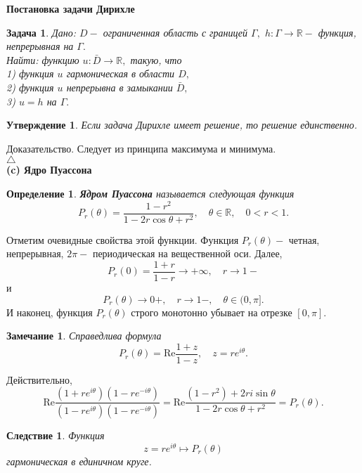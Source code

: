 \documentclass[12 pt, a4 paper]{article}
\theoremstyle{plain}   \newtheorem{Pro}{Задача}
\newtheorem{Sta}{Утверждение}
\newtheorem{Def}{Определение}
\newtheorem{Rem}{Замечание}
\newtheorem{Cor}{Следствие}
\begin{document}
{\bfseries Постановка задачи Дирихле}
\begin{Pro}
{\Large Дано:}
$ D - $
ограниченная область с границей
$ \Gamma , $
$ h: \Gamma \longrightarrow \mathbb{R} - $
функция, непрерывная на
$ \Gamma . $
\\
{ \Large Найти:}
функцию
$ u:\bar D \longrightarrow \mathbb{R} , $
такую, что
\\
1) функция
$ u $
гармоническая в области
$ D , $
\\
2) функция
$ u $
непрерывна в замыкании
$ \bar D , $
\\
3) $ u=h $ на $ \Gamma . $
\end{Pro}
\begin{Sta}
Если задача Дирихле имеет решение, то решение единственно.
\end{Sta}
{\Large Доказательство.}
Следует из принципа максимума и минимума.
\\
$ \triangle $
\\
{\bfseries (c) Ядро Пуассона}
\begin{Def}
{\bfseries Ядром Пуассона}
называется следующая функция
$$
  P_r (\theta )=
  \frac{1-r^2}{1-2r\cos \theta +r^2},
  \quad \theta \in \mathbb{R},
  \quad 0<r<1.
$$
\end{Def}
Отметим очевидные свойства этой функции.
Функция
$ P_r (\theta ) - $
четная, непрерывная,
$ 2\pi-$
периодическая на вещественной оси.
Далее,
$$
  P_r (0)=\frac{1+r}{1-r} \rightarrow +\infty ,
  \quad r \rightarrow 1-
$$
и
$$
  P_r (\theta ) \rightarrow 0+ ,
  \quad r \rightarrow 1-  , \quad
  \theta \in (0, \pi ] .
$$
И наконец, функция
$ P_r (\theta ) $
строго монотонно убывает на отрезке
$ [0,\pi ]. $
\begin{Rem}
Справедлива формула
$$
  P_r (\theta )= \mathrm{Re}\frac{1+z}{1-z} ,
  \quad z=re^{i\theta}.
$$
\end{Rem}
Действительно,
$$
 \mathrm{Re} \frac{(1+re^{i\theta})(1-re^{-i\theta})}
 {(1-re^{i\theta})(1-re^{-i\theta})}=
 \mathrm{Re}\frac{(1-r^2)+2ri \sin \theta}
 {1-2r \cos \theta +r^2}=P_r (\theta ).
$$
\begin{Cor}
Функция
$$
  z=re^{i\theta} \mapsto P_r (\theta )
$$
гармоническая в единичном круге.
\end{Cor}
\end{document}
